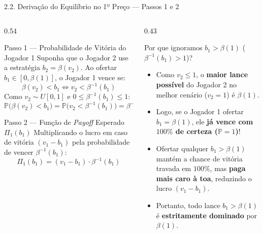 \documentclass[aspectratio=169, 10pt]{beamer}
\newcommand{\defbox}[2]{%
  \begin{block}{#1}
    \footnotesize\setlength{\abovedisplayskip}{4pt}\setlength{\belowdisplayskip}{4pt}
    #2\par
  \end{block}%
}
\newcommand{\teobox}[2]{%
  \begin{alertblock}{#1}
    \footnotesize\setlength{\abovedisplayskip}{4pt}\setlength{\belowdisplayskip}{4pt}
    #2\par
  \end{alertblock}%
}
\begin{document}
\begin{frame}{2.2. Derivação do Equilíbrio no 1º Preço --- Passos 1 e 2}
  \begin{columns}[T, onlytextwidth]
    \begin{column}{0.54\textwidth}
      \defbox{Passo 1 --- Probabilidade de Vitória do Jogador 1}{%
        Suponha que o Jogador 2 use a estratégia $b_2 = \beta(v_2)$.
        Ao ofertar $b_1 \in [0, \beta(1)]$, o Jogador 1 vence se:
        \[
          \beta(v_2) < b_1 \iff v_2 < \beta^{-1}(b_1)
        \]
        Como $v_2 \sim U[0,1]$ e $0 \le \beta^{-1}(b_1) \le 1$:
        \[
          \boxed{\mathbb{P}\big(\beta(v_2) < b_1\big) =
          \mathbb{P}\big(v_2 < \beta^{-1}(b_1)\big) = \beta^{-1}(b_1)}
        \]
      }
      \defbox{Passo 2 --- Função de \textit{Payoff} Esperado $\Pi_1(b_1)$}{%
        Multiplicando o lucro em caso de vitória $(v_1 - b_1)$ pela
        probabilidade de vencer $\beta^{-1}(b_1)$:
        \[
          \boxed{\Pi_1(b_1) = (v_1 - b_1)\cdot \beta^{-1}(b_1)}
        \]
      }
    \end{column}
    \begin{column}{0.43\textwidth}
      \teobox{Por que ignoramos $b_1 > \beta(1)$ ($\beta^{-1}(b_1) > 1$)?}{%
      \begin{itemize}\setlength{\itemsep}{4pt}
          \item Como $v_2 \le 1$, o \textbf{maior lance possível} do
            Jogador 2 no melhor cenário ($v_2 = 1$) é $\beta(1)$.
          \item Logo, se o Jogador 1 ofertar $b_1 = \beta(1)$, ele
            \textbf{já vence com $100\%$ de certeza ($\mathbb{P} = 1$)}!
          \item Ofertar qualquer $b_1 > \beta(1)$ mantém a chance de
            vitória travada em $100\%$, mas \textbf{paga mais caro à
            toa}, reduzindo o lucro $(v_1 - b_1)$.
          \item Portanto, todo lance $b_1 > \beta(1)$ é
            \textbf{estritamente dominado} por $\beta(1)$.
        \end{itemize}
      }
    \end{column}
  \end{columns}
\end{frame}
\end{document}
